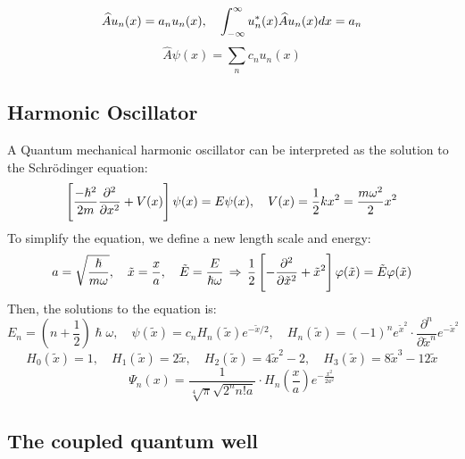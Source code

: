 \documentclass{article}
\begin{document}
$$\widehat{A} u_n(x) = a_n u_n(x), \quad \int_{-\infty}^{\infty} u^\ast_n(x) \widehat{A} u_n(x) dx = a_n$$
$$\hat{A} \psi(x) = \sum_n c_n u_n(x)$$

\subsection{Harmonic Oscillator}

A Quantum mechanical harmonic oscillator can be interpreted as the solution to the Schrödinger equation:
$$\left[ \frac{-\hslash^2}{2m} \frac{\partial^2 }{\partial x ^2}  + V(x) \right] \psi(x) = E \psi(x), \quad V(x) = \frac{1}{2} k x^2 = \frac{m \omega^2}{2} x^2$$
To simplify the equation, we define a new length scale and energy:
$$a = \sqrt{\frac{\hslash}{m \omega}}, \quad \tilde{x} = \frac{x}{a}, \quad \tilde{E} = \frac{E}{\hslash \omega} \, \Rightarrow \, \frac{1}{2} \left[-\frac{\partial^2 }{\partial \tilde{x} ^2} + \tilde{x}^2\right] \varphi(\tilde{x}) = \tilde{E} \varphi(\tilde{x})$$
Then, the solutions to the equation is:
$$E_n = \left(n + \frac{1}{2}\right) \hslash \omega, \quad \psi(\tilde{x}) = c_n H_n(\tilde{x}) e^{-
\tilde{x}/2}, \quad H_n(\tilde{x}) = (-1)^n e^{\tilde{x}^2} \cdot \frac{\partial^n}{\partial \tilde{x}^n} e^{-\tilde{x}^2}$$
$$H_0(\tilde{x}) = 1, \quad H_1(\tilde{x}) = 2 \tilde{x}, \quad H_2(\tilde{x}) = 4 \tilde{x}^2 - 2, \quad H_3(\tilde{x}) =8 \tilde{x}^3 - 12\tilde{x}$$
$$\Psi_n(x) = \frac{1}{\sqrt[4]{\pi} \sqrt{2^n n! a}} \cdot H_n\left(\frac{x}{a}\right) e^{-\frac{x^2}{2a^2}}$$

\begin{center}
\end{center}

\subsection{The coupled quantum well}
\end{document}
